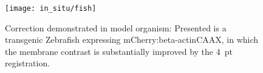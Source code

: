 \begin{figure}[h]
  \texttt{[image: in\_situ/fish]}
  \caption[Correction demonstrated in model organism]{Correction demonstrated in model organism:
  Presented is a transgenic \gls{Zebrafish} expressing mCherry:beta-actinCAAX, in which the membrane contrast is substantially improved by the 4~pt registration.%
  }
  \label{fig:homofish}
\end{figure}


